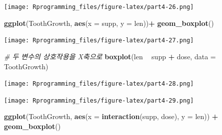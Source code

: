 \documentclass[10pt,]{krantz}
\makeatletter
\newenvironment{Shaded}{\begin{snugshade}}{\end{snugshade}}
\newcommand{\KeywordTok}[1]{\textcolor[rgb]{0.13,0.29,0.53}{\textbf{#1}}}
\newcommand{\DataTypeTok}[1]{\textcolor[rgb]{0.13,0.29,0.53}{#1}}
\newcommand{\StringTok}[1]{\textcolor[rgb]{0.31,0.60,0.02}{#1}}
\newcommand{\CommentTok}[1]{\textcolor[rgb]{0.56,0.35,0.01}{\textit{#1}}}
\newcommand{\OperatorTok}[1]{\textcolor[rgb]{0.81,0.36,0.00}{\textbf{#1}}}
\newcommand{\NormalTok}[1]{#1}
\newenvironment{kframe}{%
\medskip{}
\setlength{\fboxsep}{.8em}
 \def\at@end@of@kframe{}%
 \ifinner\ifhmode%
  \def\at@end@of@kframe{\end{minipage}}%
  \begin{minipage}{\columnwidth}%
 \fi\fi%
 \def\FrameCommand##1{\hskip\@totalleftmargin \hskip-\fboxsep
 \colorbox{shadecolor}{##1}\hskip-\fboxsep
     \hskip-\linewidth \hskip-\@totalleftmargin \hskip\columnwidth}%
 \MakeFramed {\advance\hsize-\width
   \@totalleftmargin\z@ \linewidth\hsize
   \@setminipage}}%
 {\par\unskip\endMakeFramed%
 \at@end@of@kframe}
\renewenvironment{Shaded}{\begin{kframe}}{\end{kframe}}
\theoremstyle{definition}
\theoremstyle{definition}
\theoremstyle{remark}
\makeatother
\begin{document}
\begin{Shaded}
\end{Shaded}

\texttt{[image: Rprogramming\_files/figure-latex/part4-26.png]}

\begin{Shaded}
\begin{Highlighting}[]


\KeywordTok{ggplot}\NormalTok{(ToothGrowth, }\KeywordTok{aes}\NormalTok{(}\DataTypeTok{x =}\NormalTok{ supp, }\DataTypeTok{y =}\NormalTok{ len))}\OperatorTok{+}\StringTok{ }\KeywordTok{geom_boxplot}\NormalTok{()}
\end{Highlighting}
\end{Shaded}

\texttt{[image: Rprogramming\_files/figure-latex/part4-27.png]}

\begin{Shaded}
\begin{Highlighting}[]


\CommentTok{# 두 변수의 상호작용을 X축으로}
\KeywordTok{boxplot}\NormalTok{(len }\OperatorTok{~}\StringTok{ }\NormalTok{supp }\OperatorTok{+}\StringTok{ }\NormalTok{dose, }\DataTypeTok{data =}\NormalTok{ ToothGrowth)}
\end{Highlighting}
\end{Shaded}

\texttt{[image: Rprogramming\_files/figure-latex/part4-28.png]}

\begin{Shaded}
\end{Shaded}

\texttt{[image: Rprogramming\_files/figure-latex/part4-29.png]}

\begin{Shaded}
\begin{Highlighting}[]


\KeywordTok{ggplot}\NormalTok{(ToothGrowth, }\KeywordTok{aes}\NormalTok{(}\DataTypeTok{x =} \KeywordTok{interaction}\NormalTok{(supp, dose), }\DataTypeTok{y =}\NormalTok{ len)) }\OperatorTok{+}\StringTok{ }\KeywordTok{geom_boxplot}\NormalTok{()}
\end{Highlighting}
\end{Shaded}
\end{document}
